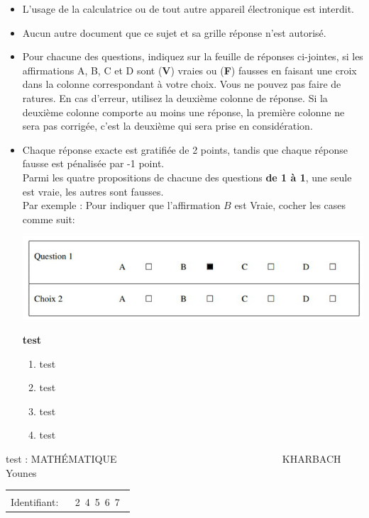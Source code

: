 \documentclass{book}%
\begin{document}
\begin{itemize}%
\item%
L'usage de la calculatrice ou de tout autre appareil électronique est interdit.%
\item%
Aucun autre document que ce sujet et sa grille réponse n'est autorisé.%
\item%
Pour chacune des questions, indiquez sur la feuille de réponses ci-jointes, si les affirmations A, B, C et D sont (\textbf{V}) vraies ou (\textbf{F}) fausses en faisant une croix dans la colonne correspondant à votre choix. Vous ne pouvez pas faire de ratures. En cas d'erreur, utilisez la deuxième colonne de réponse. Si la deuxième colonne comporte au moins une réponse, la première colonne ne sera pas corrigée, c'est la deuxième qui sera prise en considération.%
\item%
Chaque réponse exacte est gratifiée de 2 points, tandis que chaque réponse fausse est pénalisée par -1 point. \\ 	Parmi les quatre propositions de chacune des questions \textbf{de 1 à 1}, une seule est vraie, les autres sont fausses. \\ 	Par exemple : Pour indiquer que l'affirmation $B$ est Vraie, cocher les cases comme suit:  \\ \begin{center}	\includegraphics[scale=0.8]{reponses.png} \end{center}%
\thispagestyle{empty}%
\begin{exercise}%
\textbf{test }%
\begin{enumerate}[label=\textbf{\Alph*. }]%
\item%
test%
\item%
test%
\item%
test%
\item%
test%
\end{enumerate}%
\end{exercise}%
\end{itemize}%
\newpage%
\thispagestyle{empty}%
test : MATHÉMATIQUE $\qquad \qquad \qquad \qquad \qquad \qquad \qquad \qquad$ KHARBACH Younes%
\begin{flushright}%
\begin{tabular}{|l|}%
\hline%
 \\%
\thispagestyle{empty}%
Identifiant: $\quad$ {\Large 2~4~5~6~7~}%
 \\%
\hline%
\end{tabular}%
\end{flushright}%
\end{document}

